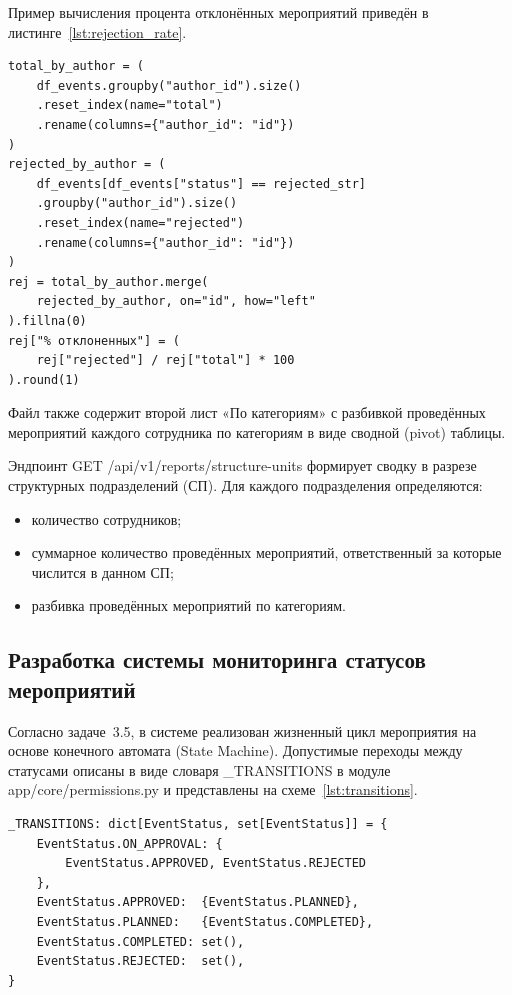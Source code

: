 Пример вычисления процента отклонённых мероприятий приведён в
листинге~\ref{lst:rejection_rate}.

\begin{lstlisting}[caption={Вычисление доли отклонённых мероприятий}, label={lst:rejection_rate}]
total_by_author = (
    df_events.groupby("author_id").size()
    .reset_index(name="total")
    .rename(columns={"author_id": "id"})
)
rejected_by_author = (
    df_events[df_events["status"] == rejected_str]
    .groupby("author_id").size()
    .reset_index(name="rejected")
    .rename(columns={"author_id": "id"})
)
rej = total_by_author.merge(
    rejected_by_author, on="id", how="left"
).fillna(0)
rej["% отклоненных"] = (
    rej["rejected"] / rej["total"] * 100
).round(1)
\end{lstlisting}

Файл также содержит второй лист «По категориям» с разбивкой
проведённых мероприятий каждого сотрудника по категориям в виде
сводной (pivot) таблицы.

Эндпоинт GET /api/v1/reports/structure-units формирует
сводку в разрезе структурных подразделений (СП). Для каждого
подразделения определяются:
\begin{itemize}
    \item количество сотрудников;
    \item суммарное количество проведённых мероприятий, ответственный
          за которые числится в данном СП;
    \item разбивка проведённых мероприятий по категориям.
\end{itemize}

\newpage
\subsection{Разработка системы мониторинга статусов мероприятий}

Согласно задаче~3.5, в системе реализован жизненный цикл мероприятия
на основе конечного автомата (State Machine). Допустимые переходы между
статусами описаны в виде словаря \_TRANSITIONS в модуле
app/core/permissions.py и представлены на
схеме~\ref{lst:transitions}.

\begin{lstlisting}[caption={Таблица допустимых переходов статусов}, label={lst:transitions}]
_TRANSITIONS: dict[EventStatus, set[EventStatus]] = {
    EventStatus.ON_APPROVAL: {
        EventStatus.APPROVED, EventStatus.REJECTED
    },
    EventStatus.APPROVED:  {EventStatus.PLANNED},
    EventStatus.PLANNED:   {EventStatus.COMPLETED},
    EventStatus.COMPLETED: set(),
    EventStatus.REJECTED:  set(),
}
\end{lstlisting}

